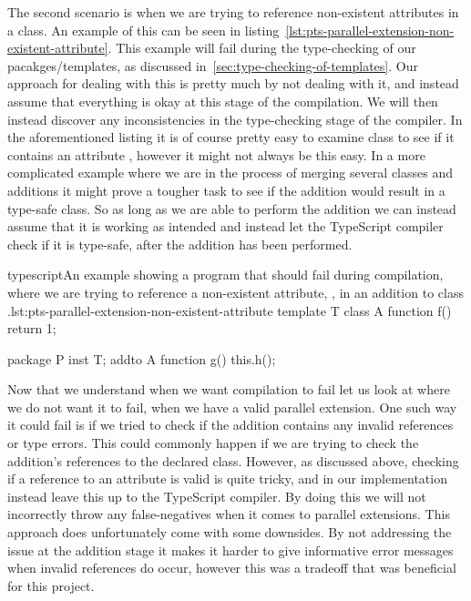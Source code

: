 The second scenario is when we are trying to reference non-existent attributes in a class.
An example of this can be seen in listing~\vref{lst:pts-parallel-extension-non-existent-attribute}.
This example will fail during the type-checking of our pacakges/templates, as discussed in~\vref{sec:type-checking-of-templates}.
Our approach for dealing with this is pretty much by not dealing with it, and instead assume that everything is okay at this stage of the compilation.
We will then instead discover any inconsistencies in the type-checking stage of the compiler.
In the aforementioned listing it is of course pretty easy to examine class  to see if it contains an attribute , however it might not always be this easy.
In a more complicated example where we are in the process of merging several classes and additions it might prove a tougher task to see if the addition would result in a type-safe class.
So as long as we are able to perform the addition we can instead assume that it is working as intended and instead let the TypeScript compiler check if it is type-safe, after the addition has been performed.

\begin{code}{typescript}{An example showing a program that should fail during compilation, where we are trying to reference a non-existent attribute, , in an addition to class .}{lst:pts-parallel-extension-non-existent-attribute}
    template T {
        class A {
            function f() {
                return 1;
            }
        }
    }

    package P {
        inst T;
        addto A {
            function g() {
                this.h();
            }
        }
    }
\end{code}

Now that we understand when we want compilation to fail let us look at where we do not want it to fail, when we have a valid parallel extension.
One such way it could fail is if we tried to check if the addition contains any invalid references or type errors.
This could commonly happen if we are trying to check the addition's references to the declared class.
However, as discussed above, checking if a reference to an attribute is valid is quite tricky, and in our implementation instead leave this up to the TypeScript compiler.
By doing this we will not incorrectly throw any false-negatives when it comes to parallel extensions.
This approach does unfortunately come with some downsides.
By not addressing the issue at the addition stage it makes it harder to give informative error messages when invalid references do occur, however this was a tradeoff that was beneficial for this project.

